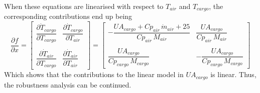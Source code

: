 When these equations are linearised with respect to $ T_{air} $ and $ T_{cargo} $, the corresponding contributions end up being
\begin{equation} \label{eq:UA_cargo_dependencies}
	\dfrac{\partial f}{\partial x} =
	\begin{bmatrix}
		\dfrac{\partial \dot{T}_{cargo}}{\partial T_{cargo}}  & \dfrac{\partial \dot{T}_{cargo}}{\partial T_{air}}\\
		\\
		\dfrac{\partial \dot{T}_{air}}{\partial T_{cargo}}  & \dfrac{\partial  \dot{T}_{air}}{\partial T_{air}}
	\end{bmatrix}
	=
	\begin{bmatrix}
		-\dfrac{UA_{cargo} +Cp_{air} \,\dot{m}_{air} +25}{Cp_{air} \,M_{air}}  & \dfrac{UA_{cargo} }{Cp_{air} \,M_{air} }\\
		\\
		\dfrac{UA_{cargo} }{Cp_{cargo} \,M_{cargo} }  & -\dfrac{UA_{cargo} }{Cp_{cargo} \,M_{cargo} }
	\end{bmatrix} 
\end{equation}
Which shows that the contributions to the linear model in $ UA_{cargo} $ is linear.
Thus, the robustness analysis can be continued.

